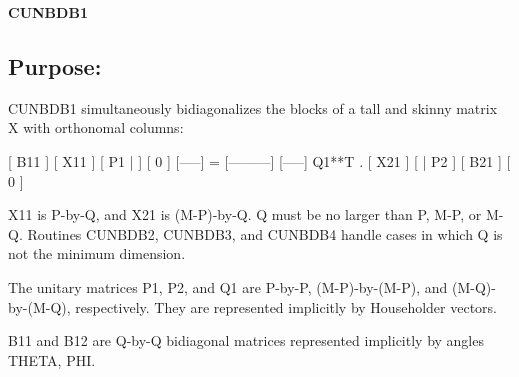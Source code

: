 {\bfseries C\+U\+N\+B\+D\+B1} 

\subsection*{Purpose\+: }

\begin{DoxyVerb} CUNBDB1 simultaneously bidiagonalizes the blocks of a tall and skinny
 matrix X with orthonomal columns:

                            [ B11 ]
      [ X11 ]   [ P1 |    ] [  0  ]
      [-----] = [---------] [-----] Q1**T .
      [ X21 ]   [    | P2 ] [ B21 ]
                            [  0  ]

 X11 is P-by-Q, and X21 is (M-P)-by-Q. Q must be no larger than P,
 M-P, or M-Q. Routines CUNBDB2, CUNBDB3, and CUNBDB4 handle cases in
 which Q is not the minimum dimension.

 The unitary matrices P1, P2, and Q1 are P-by-P, (M-P)-by-(M-P),
 and (M-Q)-by-(M-Q), respectively. They are represented implicitly by
 Householder vectors.

 B11 and B12 are Q-by-Q bidiagonal matrices represented implicitly by
 angles THETA, PHI.\end{DoxyVerb}
 
